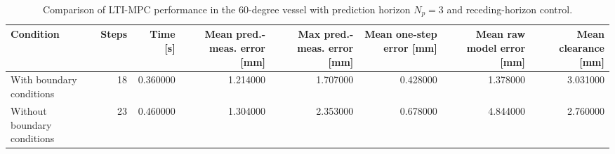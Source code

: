 \begin{table}
\caption{Comparison of LTI-MPC performance in the 60-degree vessel with prediction horizon $N_p=3$ and receding-horizon control.}
\label{tab:lti_mpc_boundary_comparison}
\begin{tabular}{lrrrrrrr}
\toprule
Condition & Steps & Time [s] & Mean pred.-meas. error [mm] & Max pred.-meas. error [mm] & Mean one-step error [mm] & Mean raw model error [mm] & Mean clearance [mm] \\
\midrule
With boundary conditions & 18 & 0.360000 & 1.214000 & 1.707000 & 0.428000 & 1.378000 & 3.031000 \\
Without boundary conditions & 23 & 0.460000 & 1.304000 & 2.353000 & 0.678000 & 4.844000 & 2.760000 \\
\bottomrule
\end{tabular}
\end{table}
